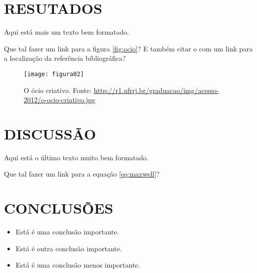 \section{RESUTADOS}

Aqui está mais um texto bem formatado. \blindtext[1]

Que tal fazer um link para a figura \autoref{fig:ocio}? E também citar o \citet{Feyerabend1977} com um link para a localização da referência bibliográfica?

\begin{figure}[!ht]
\centering
\texttt{[image: figura02]}
\caption{\label{fig:ocio}O ócio criativo. Fonte: \url{http://r1.ufrrj.br/graduacao/img/acesso-2012/o-ocio-criativo.jpg}}
\end{figure}

\section{DISCUSSÃO}

Aqui está o último texto muito bem formatado. \blindtext[2]

Que tal fazer um link para a equação \autoref{eq:maxwell}?

\section{CONCLUSÕES}

\begin{itemize}
  \item Está é uma conclusão importante.
  \item Está é outra conclusão importante.
  \item Está é uma conclusão menos importante.
\end{itemize}
